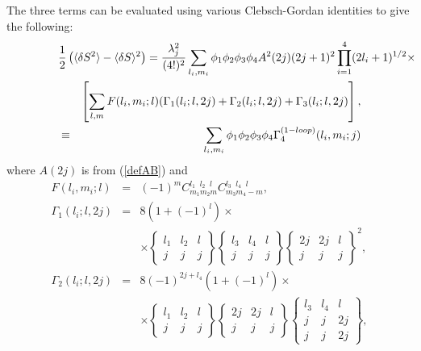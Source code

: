 \documentclass[a4paper,12pt]{article}
\numberwithin{equation}{section}
\begin{document}
The three terms can be evaluated using various Clebsch-Gordan
identities \cite{vmkBook} to give the following:
\begin{eqnarray} 
\lefteqn{\frac{1}{2}\left(\langle \delta S^2 \rangle - \langle \delta S
\rangle^2 \right) = \frac{\lambda_j^2}{(4!)^2} \sum_{l_i,m_i} \phi_1
\phi_2 \phi_3 \phi_4 A^2(2j)(2j+1)^2 \prod_{i=1}^{4}(2l_i +1)^{1/2}
\times} \nonumber \\
&&\left[ \sum_{l,m} F(l_i,m_i;l)(\Gamma_1(l_i;l,2j) +
\Gamma_2(l_i;l,2j) + \Gamma_3(l_i;l,2j)\right], \\
&\equiv&\sum_{l_i,m_i} \phi_1 \phi_2 \phi_3 \phi_4 \Gamma^{(1-loop)}_4
(l_i,m_i;j)   
\end{eqnarray}  
where $A(2j)$ is from (\ref{defAB}) and
\begin{eqnarray} 
F(l_i,m_i;l) &=& (-1)^m C_{m_1 m_2 m}^{l_1\;\; l_2\;\; l} C_{m_3 m_4
-m}^{l_3\;\;l_4\;\; l}, \\
\Gamma_1(l_i;l,2j) &=& 8(1+(-1)^l) \times \nonumber \\
&& \times \left\{ \begin{array}{ccc}
	             l_1 & l_2 & l \\
	             j   & j   & j
		  \end{array} \right\} 
\left\{ \begin{array}{ccc} 
             l_3 & l_4 & l \\
	     j   & j   & j
	\end{array} \right\} \left\{ \begin{array}{ccc}
				2j & 2j & l \\
				j   & j   & j
			  \end{array} \right\}^2, \\
\Gamma_2(l_i;l,2j) &=& 8 (-1)^{2j+l_4} (1+(-1)^l) \times \nonumber \\
&& \times \left\{ \begin{array}{ccc}
            l_1 & l_2 & l \\
	    j   & j   & j
	\end{array} \right\}\left\{ \begin{array}{ccc}
				       2j & 2j & l \\
				      j   & j   & j
			  	     \end{array} \right\} 
\left\{ \begin{array}{ccc}
	    l_3 & l_4 & l \\
	    j   & j   & 2j\\
            j   & j   & 2j
        \end{array}\right\}, \\

\end{eqnarray}
\end{document}
